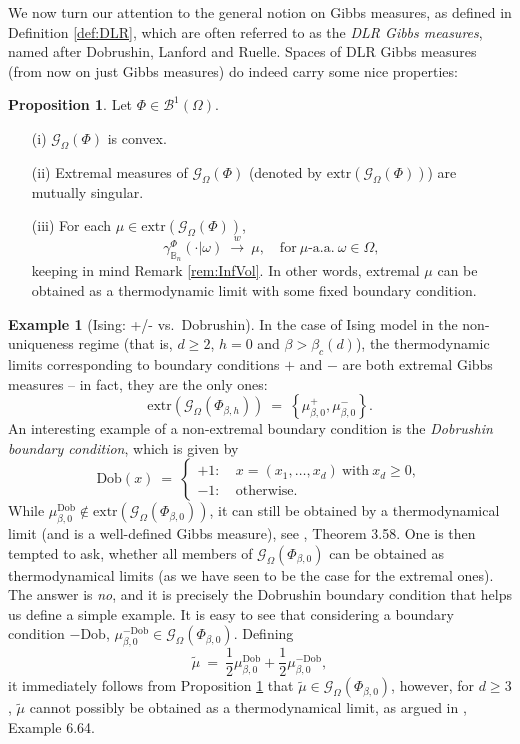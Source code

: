 \documentclass[12pt]{article}
\newcommand{\BB}{\mathscr{B}}
\newcommand{\BBB}{\mathbb{B}}
\newcommand{\G}{\mathcal{G}}
\newcommand{\extr}{\mathrm{extr}}
\newcommand{\set}[1]{\left\{#1\right\}}
\newcommand{\pika}{\boldsymbol{\cdot}}
\newcommand{\1}{\mathbbm{1}}
\newcommand{\5}{\vspace{0.5cm}}
\renewcommand{\tilde}{\widetilde}
\theoremstyle{definition}
\newtheorem{ex}[thm]{Example}
\newtheorem{prop}[thm]{Proposition}
\begin{document}
We now turn our attention to the general notion on Gibbs measures, as defined in Definition \ref{def:DLR}, which are often referred to as the \textit{DLR Gibbs measures}, named after Dobrushin, Lanford and Ruelle. Spaces of DLR Gibbs measures (from now on just Gibbs measures) do indeed carry some nice properties:

\begin{prop}\label{DLR:properties}
Let $\Phi\in\BB^1(\Omega)$.
\begin{itemize}
	\item[(i)] $\G_\Omega(\Phi)$ is convex.
	\item[(ii)] Extremal measures of $\G_\Omega(\Phi)$ (denoted by $\extr(\G_\Omega(\Phi))$) are mutually singular.
	\item[(iii)] For each $\mu\in\extr(\G_\Omega(\Phi))$,
	$$\gamma_{\BBB_n}^\Phi(\pika|\omega) ~\xrightarrow{w}~ \mu, \quad \text{for}~\mu\text{-a.a.}~\omega\in\Omega,$$
	keeping in mind Remark \ref{rem:InfVol}. In other words, extremal $\mu$ can be obtained as a thermodynamic limit with some fixed boundary condition.
\end{itemize}
\end{prop}

\begin{ex}[Ising: +/- vs.~Dobrushin]
In the case of Ising model in the non-uniqueness regime (that is, $d\geq 2$, $h=0$ and $\beta>\beta_c(d)$), the thermodynamic limits corresponding to boundary conditions $+$ and $-$ are both extremal Gibbs measures -- in fact, they are the only ones:
$$\mathrm{extr}(\G_\Omega(\Phi_{\beta,h})) ~=~ \set{\mu_{\beta,0}^+,\mu_{\beta,0}^-}.$$
An interesting example of a non-extremal boundary condition is the \textit{Dobrushin boundary condition}, which is given by
$$\mathrm{Dob}(x) ~=~ \begin{cases}
+1: ~&x=(x_1,\ldots,x_d)~\text{with}~x_d\geq 0,\\
-1: ~&\text{otherwise}. 
\end{cases}$$
While $\mu_{\beta,0}^{\mathrm{Dob}}\notin\mathrm{extr}(\G_\Omega(\Phi_{\beta,0}))$, it can still be obtained by a thermodynamical limit (and is a well-defined Gibbs measure), see \cite{FV}, Theorem 3.58. One is then tempted to ask, whether all members of $\G_\Omega(\Phi_{\beta,0})$ can be obtained as thermodynamical limits (as we have seen to be the case for the extremal ones). The answer is \textit{no}, and it is precisely the Dobrushin boundary condition that helps us define a simple example. It is easy to see that considering a boundary condition $-\mathrm{Dob}$, $\mu_{\beta,0}^{-\mathrm{Dob}}\in\G_\Omega(\Phi_{\beta,0})$. Defining
$$\tilde{\mu} ~=~ \frac{1}{2}\mu_{\beta,0}^{\mathrm{Dob}} + \frac{1}{2}\mu_{\beta,0}^{-\mathrm{Dob}},$$
it immediately follows from Proposition \ref{DLR:properties} that $\tilde{\mu}\in\G_{\Omega}(\Phi_{\beta,0})$, however, for $d\geq 3$, $\tilde{\mu}$ cannot possibly be obtained as a thermodynamical limit, as argued in \cite{FV}, Example 6.64.
\end{ex}
\end{document}
